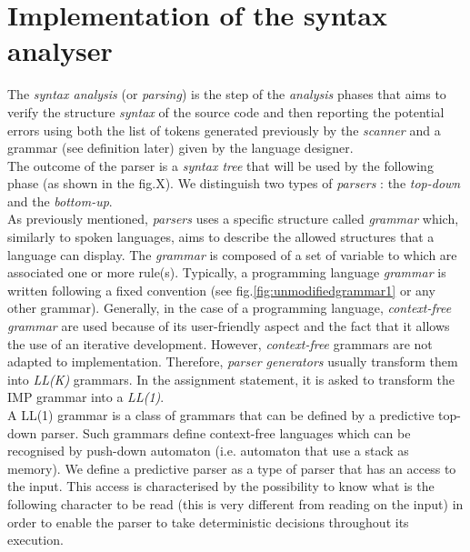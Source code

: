 \documentclass[a4paper,11pt]{article}
\begin{document}
\section{Implementation of the syntax analyser}
  The \textit{syntax analysis} (or \textit{parsing}) is the step of the \textit{analysis} phases that aims to verify the structure \textit{syntax} of the source code and then reporting the potential errors using both the list of tokens generated previously by the \textit{scanner} and a grammar (see definition later) given by the language designer.\\
  The outcome of the parser is a \textit{syntax tree} that will be used by the following phase (as shown in the fig.X). We distinguish two types of \textit{parsers} : the \textit{top-down} and the \textit{bottom-up}.\\
  As previously mentioned, \textit{parsers} uses a specific structure called \textit{grammar} which, similarly to spoken languages, aims to describe the allowed structures that a language can display.%
  The \textit{grammar} is composed of a set of variable to which are associated one or more rule(s). Typically, a programming language \textit{grammar} is written following a fixed convention (see fig.\ref{fig:unmodifiedgrammar1} or any other grammar). Generally, in the case of a programming language, \textit{context-free grammar} are used because of its user-friendly aspect and the fact that it allows the use of an iterative development. However, \textit{context-free} grammars are not adapted to implementation. Therefore, \textit{parser generators} usually transform them into \textit{LL(K)} grammars. In the assignment statement, it is asked to transform the IMP grammar into a \textit{LL(1)}.\\
  A LL(1) grammar is a class of grammars that can be defined by a predictive top-down parser. Such grammars define context-free languages which can be recognised by push-down automaton (i.e. automaton that use a stack as memory). We define a predictive parser as a type of parser that has an access to the input. This access is characterised by the possibility to know what is the following character to be read (this is very different from reading on the input) in order to enable the parser to take deterministic decisions throughout its execution.\\
  
\end{document}

